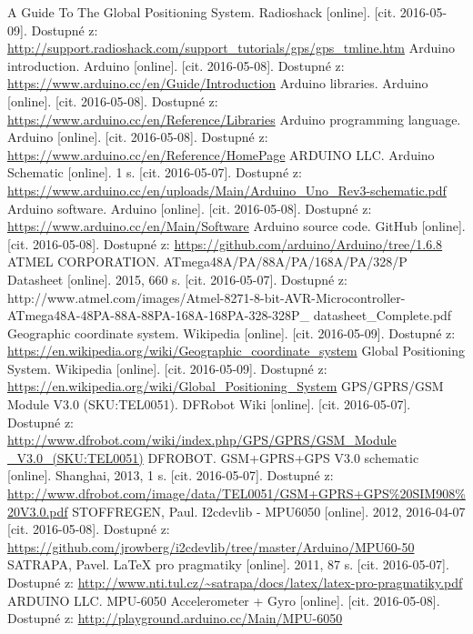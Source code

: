 \documentclass[FM,BP]{tulthesis}  %
\begin{document}
\begin{thebibliography}{10}
A Guide To The Global Positioning System. Radioshack [online]. [cit. 2016-05-09]. Dostupné z: \url{http://support.radioshack.com/support\_tutorials/gps/gps\_tmline.htm}
Arduino introduction. Arduino [online]. [cit. 2016-05-08]. Dostupné z: \url{https://www.arduino.cc/en/Guide/Introduction}
Arduino libraries. Arduino [online]. [cit. 2016-05-08]. Dostupné z: \url{https://www.arduino.cc/en/Reference/Libraries}
Arduino programming language. Arduino [online]. [cit. 2016-05-08]. Dostupné z: \url{https://www.arduino.cc/en/Reference/HomePage}
ARDUINO LLC. Arduino Schematic [online]. 1 s. [cit. 2016-05-07]. Dostupné z: \url{https://www.arduino.cc/en/uploads/Main/Arduino\_Uno\_Rev3-schematic.pdf}
 Arduino software. Arduino [online]. [cit. 2016-05-08]. Dostupné z: \url{https://www.arduino.cc/en/Main/Software}
Arduino source code. GitHub [online]. [cit. 2016-05-08]. Dostupné z: \url{https://github.com/arduino/Arduino/tree/1.6.8}
ATMEL CORPORATION. ATmega48A/PA/88A/PA/168A/PA/328/P Datasheet [online]. 2015, 660 s. [cit. 2016-05-07]. Dostupné z: http://www.atmel.com/images/Atmel-8271-8-bit-AVR-Microcontroller-ATmega48A-48PA-88A-88PA-168A-168PA-328-328P\_ datasheet\_Complete.pdf
Geographic coordinate system. Wikipedia [online]. [cit. 2016-05-09]. Dostupné z: \url{https://en.wikipedia.org/wiki/Geographic\_coordinate\_system}
Global Positioning System. Wikipedia [online]. [cit. 2016-05-09]. Dostupné z: \url{https://en.wikipedia.org/wiki/Global\_Positioning\_System}
GPS/GPRS/GSM Module V3.0 (SKU:TEL0051). DFRobot Wiki [online]. [cit. 2016-05-07]. Dostupné z: \url{http://www.dfrobot.com/wiki/index.php/GPS/GPRS/GSM\_Module \_V3.0\_(SKU:TEL0051)}
DFROBOT. GSM+GPRS+GPS V3.0 schematic [online]. Shanghai, 2013, 1 s. [cit. 2016-05-07]. Dostupné z: \url{http://www.dfrobot.com/image/data/TEL0051/GSM+GPRS+GPS\%20SIM908\%20V3.0.pdf}
STOFFREGEN, Paul. I2cdevlib - MPU6050 [online]. 2012, 2016-04-07 [cit. 2016-05-08]. Dostupné z: \url{https://github.com/jrowberg/i2cdevlib/tree/master/Arduino/MPU60-50}
SATRAPA, Pavel. LaTeX pro pragmatiky [online]. 2011, 87 s. [cit. 2016-05-07]. Dostupné z: \url{http://www.nti.tul.cz/~satrapa/docs/latex/latex-pro-pragmatiky.pdf}
ARDUINO LLC. MPU-6050 Accelerometer + Gyro [online]. [cit. 2016-05-08]. Dostupné z: \url{http://playground.arduino.cc/Main/MPU-6050}

\end{thebibliography}
\end{document}
